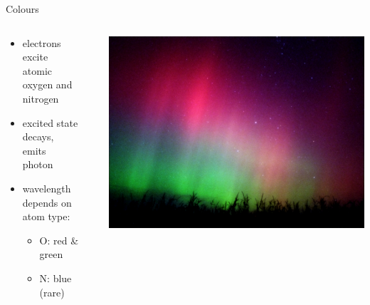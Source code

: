 \documentclass[xcolor=pdftex,dvipsnames,table,usenames,11pt]{beamer}
\begin{document}
\begin{frame}{Colours}
\begin{columns}[onlytextwidth]
  \begin{column}{0.5\textwidth}
    \begin{itemize}
    \item electrons excite atomic oxygen and nitrogen
    \item excited state decays, emits photon 
    \item wavelength depends on atom type:
    \begin{itemize}
        \item{O: red \& green}
        \item{N: blue (rare)}
    \end{itemize}
    \end{itemize}
  \end{column}
  \begin{column}{0.05\textwidth}
  \end{column}
  \begin{column}{0.5\textwidth}
    \includegraphics[width=\textwidth]{img/p4a.jpg}
  \end{column}
\end{columns}
\end{frame}
\end{document}
